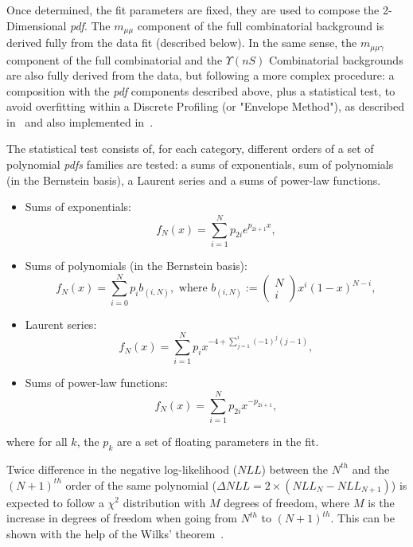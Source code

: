 

Once determined, the fit parameters are fixed, they are used to compose the 2-Dimensional \textit{pdf}. The $m_{\mu\mu}$ component of the full combinatorial background is derived fully from the data fit (described below). In the same sense, the $m_{\mu\mu\gamma}$ component of the full combinatorial and the $\Upsilon(nS)$ Combinatorial backgrounds are also fully derived from the data, but following a more complex procedure: a composition with the \textit{pdf} components described above, plus a statistical test, to avoid overfitting within a Discrete Profiling (or "Envelope Method"), as described in~\cite{DiscreteProfilingMethod} and also implemented in~\cite{higgs_gammagamma_PAPPER}. 

The statistical test consists of, for each category, different orders of a set of polynomial \textit{pdfs} families are tested: a sums of exponentials, sum of polynomials (in the Bernstein basis), a Laurent series and a sums of power-law functions. 


\begin{itemize}
\item Sums of exponentials: $$ f_{N}(x)= \sum^{N}_{i=1} p_{2i} e^{p_{2i+1} x} ,$$
\item Sums of polynomials (in the Bernstein basis): $$ f_{N}(x) = \sum^{N}_{i=0} p_{i} b_{(i,N)}, \text{ where } b_{(i,N)}:= \begin{pmatrix} N \\ i \end{pmatrix} x^i (1-x)^{N-i} ,$$
\item Laurent series: $$ f_{N}(x)= \sum^{N}_{i=1} p_{i} x^{-4 + \sum^{i}_{j=1} (-1)^{j} (j-1)},$$
\item Sums of power-law functions: $$ f_{N}(x)= \sum^{N}_{i=1} p_{2i} x^{-p_{2i+1}},$$
\end{itemize}
where for all $k$, the $p_k$ are a set of floating parameters in the fit.

Twice difference in the negative log-likelihood ($NLL$) between the $N^{th}$ and the $(N+1)^{th}$ order of the same polynomial ($\Delta NLL = 2 \times (NLL_{N} - NLL_{N+1})$) is expected to follow a $\chi^2$ distribution with $M$ degrees of freedom, where $M$ is the increase in degrees of freedom when going from $N^{th}$ to $(N+1)^{th}$. This can be shown with the help of the Wilks' theorem~\cite{wilks1938}. 

